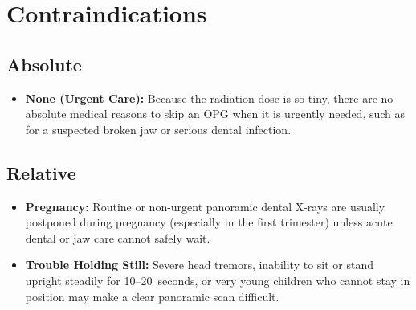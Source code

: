 \section{Contraindications}

\subsection{Absolute}
\begin{itemize}
\item \textbf{None (Urgent Care):} Because the radiation dose is so tiny, there are no absolute medical reasons to skip an OPG when it is urgently needed, such as for a suspected broken jaw or serious dental infection.
\end{itemize}

\subsection{Relative}
\begin{itemize}
\item \textbf{Pregnancy:} Routine or non-urgent panoramic dental X-rays are usually postponed during pregnancy (especially in the first trimester) unless acute dental or jaw care cannot safely wait.
\item \textbf{Trouble Holding Still:} Severe head tremors, inability to sit or stand upright steadily for 10--20~seconds, or very young children who cannot stay in position may make a clear panoramic scan difficult.
\end{itemize}

